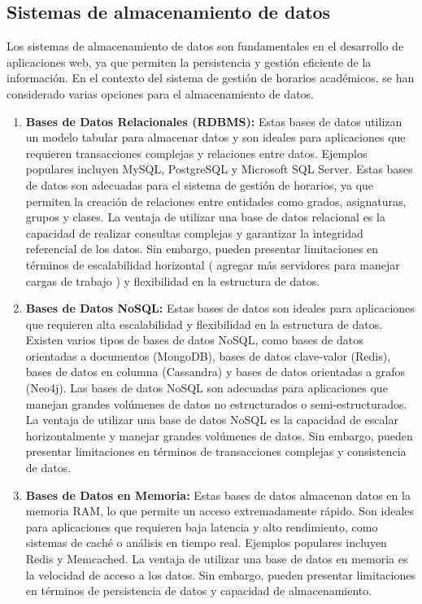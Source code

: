 \subsection{Sistemas de almacenamiento de datos}

Los sistemas de almacenamiento de datos son fundamentales en el desarrollo de aplicaciones web, ya que permiten la persistencia y gestión eficiente de la información. En el contexto del sistema de gestión de horarios académicos, se han considerado varias opciones para el almacenamiento de datos.
\begin{enumerate}
    \item \textbf{Bases de Datos Relacionales (RDBMS):} Estas bases de datos utilizan un modelo tabular para almacenar datos y son ideales para aplicaciones que requieren transacciones complejas y relaciones entre datos. Ejemplos populares incluyen MySQL\cite{mysql}, PostgreSQL\cite{postgresql} y Microsoft SQL Server\cite{sqlserver}. Estas bases de datos son adecuadas para el sistema de gestión de horarios, ya que permiten la creación de relaciones entre entidades como grados, asignaturas, grupos y clases.\newline
        La ventaja de utilizar una base de datos relacional es la capacidad de realizar consultas complejas y garantizar la integridad referencial de los datos. Sin embargo, pueden presentar limitaciones en términos de escalabilidad horizontal ( agregar más servidores para manejar cargas de trabajo ) y flexibilidad en la estructura de datos.
    
    \item \textbf{Bases de Datos NoSQL:} Estas bases de datos son ideales para aplicaciones que requieren alta escalabilidad y flexibilidad en la estructura de datos. Existen varios tipos de bases de datos NoSQL, como bases de datos orientadas a documentos (MongoDB)\cite{mongodb}, bases de datos clave-valor (Redis)\cite{redis}, bases de datos en columna (Cassandra)\cite{cassandra} y bases de datos orientadas a grafos (Neo4j)\cite{neo4j}. Las bases de datos NoSQL son adecuadas para aplicaciones que manejan grandes volúmenes de datos no estructurados o semi-estructurados.\newline
        La ventaja de utilizar una base de datos NoSQL es la capacidad de escalar horizontalmente y manejar grandes volúmenes de datos. Sin embargo, pueden presentar limitaciones en términos de transacciones complejas y consistencia de datos.

    \item \textbf{Bases de Datos en Memoria:} Estas bases de datos almacenan datos en la memoria RAM, lo que permite un acceso extremadamente rápido. Son ideales para aplicaciones que requieren baja latencia y alto rendimiento, como sistemas de caché o análisis en tiempo real. Ejemplos populares incluyen Redis y Memcached\cite{memcached}.\newline
        La ventaja de utilizar una base de datos en memoria es la velocidad de acceso a los datos. Sin embargo, pueden presentar limitaciones en términos de persistencia de datos y capacidad de almacenamiento.


\end{enumerate}
